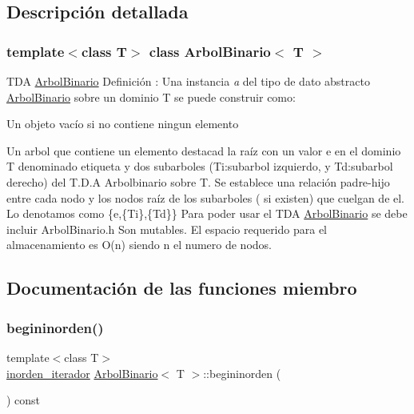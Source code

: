 \subsection{Descripción detallada}
\subsubsection*{template$<$class T$>$\newline
class Arbol\+Binario$<$ T $>$}

T\+DA \hyperlink{classArbolBinario}{Arbol\+Binario}  Definición \+: Una instancia {\itshape a} del tipo de dato abstracto \hyperlink{classArbolBinario}{Arbol\+Binario} sobre un dominio T se puede construir como\+:
\begin{DoxyItemize}
\item Un objeto vacío si no contiene ningun elemento
\item Un arbol que contiene un elemento destacad la raíz con un valor e en el dominio T denominado etiqueta y dos subarboles (Ti\+:subarbol izquierdo, y Td\+:subarbol derecho) del T.\+D.\+A Arbolbinario sobre T. Se establece una relación padre-\/hijo entre cada nodo y los nodos raíz de los subarboles ( si existen) que cuelgan de el. Lo denotamos como \{e,\{Ti\},\{Td\}\} Para poder usar el T\+DA \hyperlink{classArbolBinario}{Arbol\+Binario} se debe incluir Arbol\+Binario.\+h Son mutables. El espacio requerido para el almacenamiento es O(n) siendo n el numero de nodos. 
\end{DoxyItemize}

\subsection{Documentación de las funciones miembro}
\mbox{\label{classArbolBinario_af55ee35607b74ebc3036dc9c5c1c2ce7}} 
\subsubsection{\texorpdfstring{begininorden()}{begininorden()}}
{\footnotesize\ttfamily template$<$class T$>$ \\
\hyperlink{classArbolBinario_1_1inorden__iterador}{inorden\+\_\+iterador} \hyperlink{classArbolBinario}{Arbol\+Binario}$<$ T $>$\+::begininorden (\begin{DoxyParamCaption}{ }\end{DoxyParamCaption}) const}



